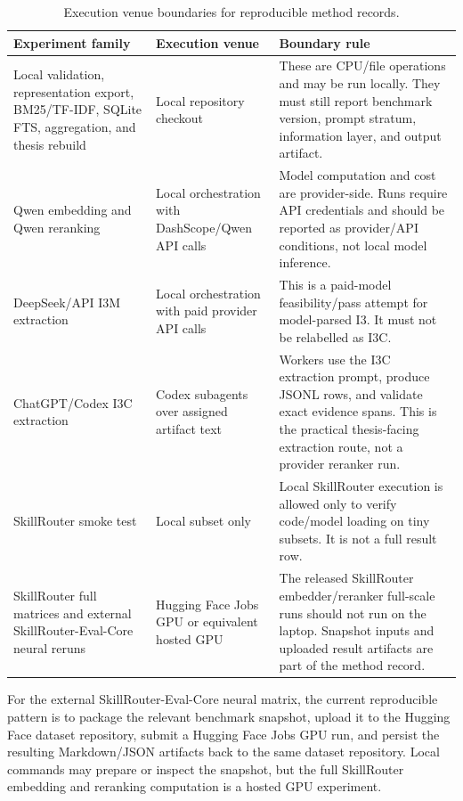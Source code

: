 \begin{table}[h]
\centering
\scriptsize
\setlength{\tabcolsep}{3pt}
\begin{tabular}{p{}p{}p{}}
\toprule
Experiment family & Execution venue & Boundary rule \\
\midrule
Local validation, representation export, BM25/TF-IDF, SQLite FTS, aggregation, and thesis rebuild & Local repository checkout & These are CPU/file operations and may be run locally. They must still report benchmark version, prompt stratum, information layer, and output artifact. \\
Qwen embedding and Qwen reranking & Local orchestration with DashScope/Qwen API calls & Model computation and cost are provider-side. Runs require API credentials and should be reported as provider/API conditions, not local model inference. \\
DeepSeek/API I3M extraction & Local orchestration with paid provider API calls & This is a paid-model feasibility/pass attempt for model-parsed I3. It must not be relabelled as I3C. \\
ChatGPT/Codex I3C extraction & Codex subagents over assigned artifact text & Workers use the I3C extraction prompt, produce JSONL rows, and validate exact evidence spans. This is the practical thesis-facing extraction route, not a provider reranker run. \\
SkillRouter smoke test & Local subset only & Local SkillRouter execution is allowed only to verify code/model loading on tiny subsets. It is not a full result row. \\
SkillRouter full matrices and external SkillRouter-Eval-Core neural reruns & Hugging Face Jobs GPU or equivalent hosted GPU & The released SkillRouter embedder/reranker full-scale runs should not run on the laptop. Snapshot inputs and uploaded result artifacts are part of the method record. \\
\bottomrule
\end{tabular}
\caption{Execution venue boundaries for reproducible method records.}
\label{tab:execution-venue-boundaries}
\end{table}

For the external SkillRouter-Eval-Core neural matrix, the current reproducible pattern is to package the relevant benchmark snapshot, upload it to the Hugging Face dataset repository, submit a Hugging Face Jobs GPU run, and persist the resulting Markdown/JSON artifacts back to the same dataset repository. Local commands may prepare or inspect the snapshot, but the full SkillRouter embedding and reranking computation is a hosted GPU experiment.

